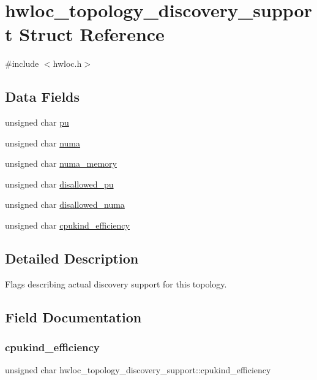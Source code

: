 \hypertarget{a00290}{}\section{hwloc\+\_\+topology\+\_\+discovery\+\_\+support Struct Reference}
\label{a00290}


{\ttfamily \#include $<$hwloc.\+h$>$}

\subsection*{Data Fields}
\begin{DoxyCompactItemize}
\item 
unsigned char \hyperlink{a00290_ad7bb4ecf7a82f5a04fc632e9592ad3ab}{pu}
\item 
unsigned char \hyperlink{a00290_a955f96066cb9e4cd34e2a3710ad43e80}{numa}
\item 
unsigned char \hyperlink{a00290_af193eb858e40e12ef4923f5ed0e1f11a}{numa\+\_\+memory}
\item 
unsigned char \hyperlink{a00290_af3c97b28781a2972cf8eaaf94a6617da}{disallowed\+\_\+pu}
\item 
unsigned char \hyperlink{a00290_a970e65235873bcdb9669a9805161ce03}{disallowed\+\_\+numa}
\item 
unsigned char \hyperlink{a00290_aba80d6f9c15e2395f9ed61db9ff3b75d}{cpukind\+\_\+efficiency}
\end{DoxyCompactItemize}


\subsection{Detailed Description}
Flags describing actual discovery support for this topology. 

\subsection{Field Documentation}
\mbox{\label{a00290_aba80d6f9c15e2395f9ed61db9ff3b75d}} 
\subsubsection{\texorpdfstring{cpukind\+\_\+efficiency}{cpukind\_efficiency}}
{\footnotesize\ttfamily unsigned char hwloc\+\_\+topology\+\_\+discovery\+\_\+support\+::cpukind\+\_\+efficiency}




